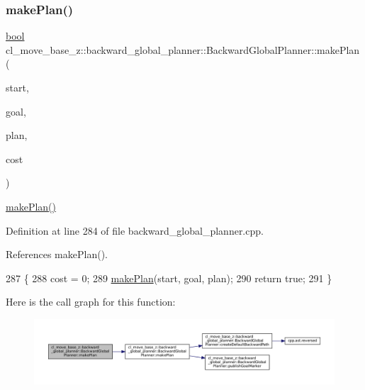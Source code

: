 \subsubsection{\texorpdfstring{make\+Plan()}{makePlan()}\hspace{0.1cm}{\footnotesize\ttfamily [2/2]}}
{\footnotesize\ttfamily \hyperlink{classbool}{bool} cl\+\_\+move\+\_\+base\+\_\+z\+::backward\+\_\+global\+\_\+planner\+::\+Backward\+Global\+Planner\+::make\+Plan (\begin{DoxyParamCaption}\item[{const geometry\+\_\+msgs\+::\+Pose\+Stamped \&}]{start,  }\item[{const geometry\+\_\+msgs\+::\+Pose\+Stamped \&}]{goal,  }\item[{std\+::vector$<$ geometry\+\_\+msgs\+::\+Pose\+Stamped $>$ \&}]{plan,  }\item[{double \&}]{cost }\end{DoxyParamCaption})}

\hyperlink{classcl__move__base__z_1_1backward__global__planner_1_1BackwardGlobalPlanner_a3f1f3c81e7c52c9305544fd793741a41}{make\+Plan()} 

Definition at line 284 of file backward\+\_\+global\+\_\+planner.\+cpp.



References make\+Plan().


\begin{DoxyCode}
287 \{
288     cost = 0;
289     \hyperlink{classcl__move__base__z_1_1backward__global__planner_1_1BackwardGlobalPlanner_a3f1f3c81e7c52c9305544fd793741a41}{makePlan}(start, goal, plan);
290     \textcolor{keywordflow}{return} \textcolor{keyword}{true};
291 \}
\end{DoxyCode}
Here is the call graph for this function\+:
\nopagebreak
\begin{figure}[H]
\begin{center}
\leavevmode
\includegraphics[width=350pt]{classcl__move__base__z_1_1backward__global__planner_1_1BackwardGlobalPlanner_a2fe289017031d072f4ac32d017fe989d_cgraph}
\end{center}
\end{figure}
\mbox{\label{classcl__move__base__z_1_1backward__global__planner_1_1BackwardGlobalPlanner_a515bde5bfb3ae548f3e19209df1a48b0}} 
